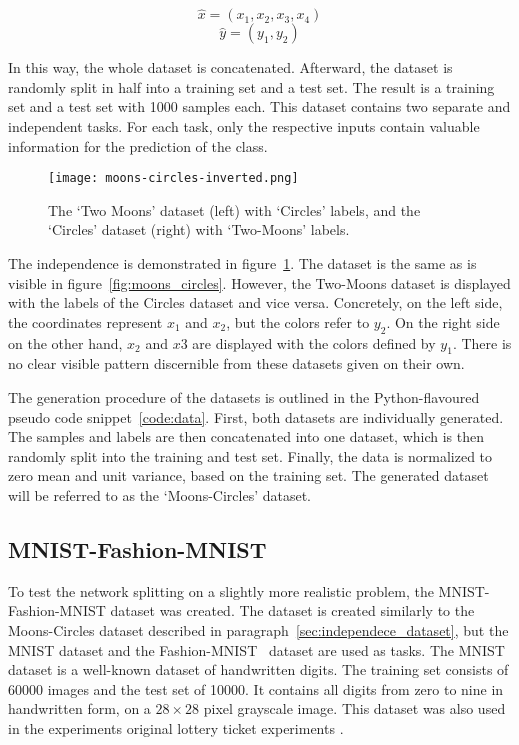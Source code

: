 \[\hat x = ( x_1 , x_2 , x_3 , x_4 )\]
\[\hat y = ( y_1 , y_2 )\]

In this way, the whole dataset is concatenated.
Afterward, the dataset is randomly split in half into a training set and a test set.
The result is a training set and a test set with 1000 samples each.
This dataset contains two separate and independent tasks.
For each task, only the respective inputs contain valuable information for the prediction of the class.

\begin{figure}[ht]
    \centering
    \texttt{[image: moons-circles-inverted.png]}
    \caption{
        The `Two Moons' dataset (left) with `Circles' labels, and the `Circles' dataset (right) with `Two-Moons' labels. 
    }\label{fig:moons_circles_inverted}
\end{figure}

The independence is demonstrated in figure~\ref{fig:moons_circles_inverted}.
The dataset is the same as is visible in figure~\ref{fig:moons_circles}. 
However, the Two-Moons dataset is displayed with the labels of the Circles dataset and vice versa.
Concretely, on the left side, the coordinates represent $x_1$ and $x_2$, but the colors refer to $y_2$.
On the right side on the other hand, $x_2$ and $x3$ are displayed with the colors defined by $y_1$.
There is no clear visible pattern discernible from these datasets given on their own.

The generation procedure of the datasets is outlined in the Python-flavoured pseudo code snippet~\ref{code:data}.
First, both datasets are individually generated.
The samples and labels are then concatenated into one dataset, which is then randomly split into the training and test set.
Finally, the data is normalized to zero mean and unit variance, based on the training set.
The generated dataset will be referred to as the `Moons-Circles' dataset.

\subsection{MNIST-Fashion-MNIST}\label{sec:mnist}
To test the network splitting on a slightly more realistic problem, the MNIST-Fashion-MNIST dataset was created.
The dataset is created similarly to the Moons-Circles dataset described in paragraph~\ref{sec:independece_dataset}, but the MNIST dataset \autocite{mnist} and the Fashion-MNIST~\autocite{fashion} dataset are used as tasks.
The MNIST dataset is a well-known dataset of handwritten digits. 
The training set consists of 60000 images and the test set of 10000.
It contains all digits from zero to nine in handwritten form, on a $28 \times 28$ pixel grayscale image.
This dataset was also used in the experiments original lottery ticket experiments \autocite{LTH}.

